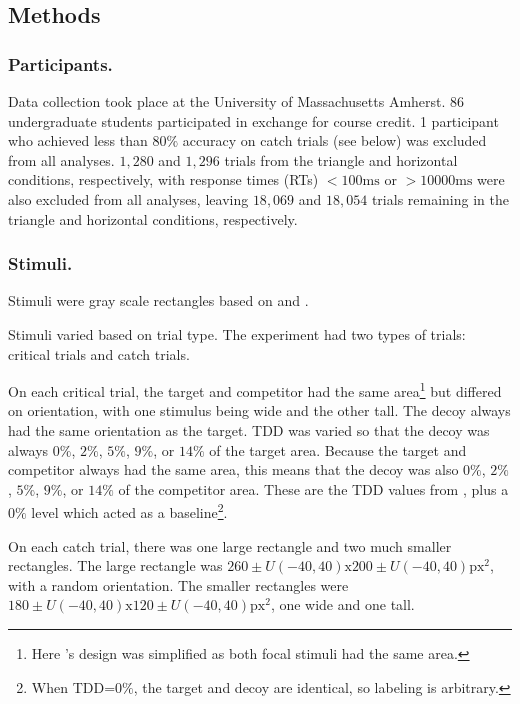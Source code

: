 \subsection{Methods}

\subsubsection{Participants.}
Data collection took place at the University of Massachusetts Amherst. 86 undergraduate students participated in exchange for course credit. 1 participant who achieved less than $80\%$ accuracy on catch trials (see below) was excluded from all analyses. $1,280$ and $1,296$ trials from the triangle and horizontal conditions, respectively, with response times (RTs) $<100\text{ms}$ or  $>10000\text{ms}$ were also excluded from all analyses, leaving $18,069$ and $18,054$ trials remaining in the triangle and horizontal conditions, respectively. 

\subsubsection{Stimuli.}
Stimuli were gray scale rectangles based on \textcite{trueblood2013not} and \textcite{spektorWhenGoodLooks2018b}. 

Stimuli varied based on trial type. The experiment had two types of trials: critical trials and catch trials.

On each critical trial, the target and competitor had the same area\footnote{Here \textcite{spektorWhenGoodLooks2018b}'s design was simplified as both focal stimuli had the same area.} but differed on orientation, with one stimulus being wide and the other tall. The decoy always had the same orientation as the target. TDD was varied so that the decoy was always $0\%$, $2\%$, $5\%$, $9\%$, or $14\%$ of the target area. Because the target and competitor always had the same area, this means that the decoy was also $0\%$, $2\%$, $5\%$, $9\%$, or $14\%$ of the competitor area. These are the TDD values from \textcite{spektorWhenGoodLooks2018b}, plus a $0\%$ level which acted as a baseline\footnote{When TDD=$0\%$, the target and decoy are identical, so labeling is arbitrary.}.

On each catch trial, there was one large rectangle and two much smaller rectangles. The large rectangle was $260 \pm U(-40, 40) \text{x} 200 \pm U(-40, 40) \text{px}^2$, with a random orientation. The smaller rectangles were $180 \pm U(-40, 40) \text{x} 120 \pm U(-40, 40) \text{px}^2$, one wide and one tall.


